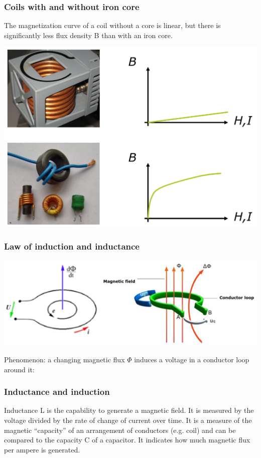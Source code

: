 \documentclass{article}
\begin{document}
\newpage
\subsubsection{Coils with and without iron core}
The magnetization curve of a coil without a core
is linear, but there is significantly less flux
density B than with an iron core.
\begin{center}
    \includegraphics[width=.7\textwidth]{media/iron_coils.png}
\end{center}

\subsubsection{Law of induction and inductance}
\begin{center}
    \includegraphics[width=.8\textwidth]{media/law_of_induction.png}
\end{center}

Phenomenon: a changing magnetic flux $\Phi$ induces a
voltage in a conductor loop around it:

\newpage
\subsubsection{Inductance and induction}
Inductance L is the capability to generate a magnetic field. It is measured by
the voltage divided by the rate of change of current over time. It is a measure of
the magnetic ``capacity'' of an arrangement of conductors (e.g. coil) and can be
compared to the capacity C of a capacitor. It indicates how much magnetic flux
per ampere is generated.
\end{document}
